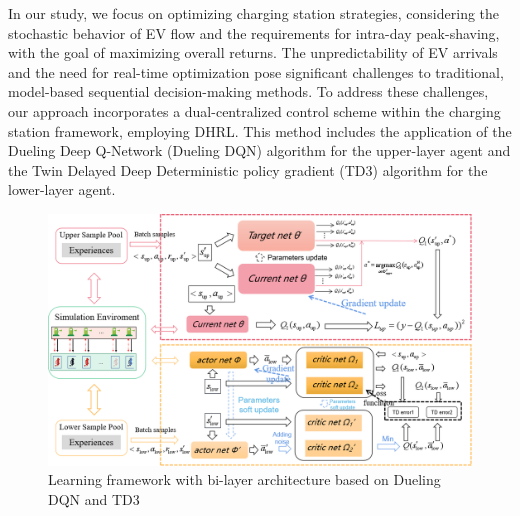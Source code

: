 \documentclass[preprint,12pt]{elsarticle}
\begin{document}
In our study, we focus on optimizing charging station strategies, considering the stochastic behavior of EV flow and the requirements for intra-day peak-shaving, with the goal of maximizing overall returns.
The unpredictability of EV arrivals and the need for real-time optimization pose significant challenges to traditional, model-based sequential decision-making methods. To address these challenges, our approach
incorporates a dual-centralized control scheme within the charging station framework, employing DHRL. This method includes the application of the Dueling Deep Q-Network (Dueling DQN) algorithm for the upper-layer agent and the Twin Delayed Deep Deterministic policy gradient (TD3) algorithm for the lower-layer agent.
\begin{figure}[h]
    \centering
    \includegraphics[width=0.95\linewidth]{figures/Learning framwork.png}
    \caption{Learning framework with bi-layer architecture based on Dueling DQN and TD3}
    \label{fig:DRL-based-learning-framwwork}
\end{figure}
\end{document}
